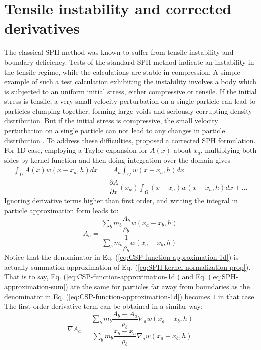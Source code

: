 \section{Tensile instability and corrected derivatives}
The classical SPH method was known to suffer from tensile instability and boundary deficiency. Tests of the standard SPH method indicate an instability in the tensile regime, while the calculations are stable in compression.  A simple example of such a test calculation exhibiting the instability involves a body which is subjected to an uniform initial stress, either compressive or tensile. If the initial stress is tensile, a very small velocity perturbation on a single particle can lead to particles clumping together, forming large voids and seriously corrupting density distribution. But if the initial stress is compressive, the small velocity perturbation on a single particle can not lead to any changes in particle distribution \citep{swegle1995smoothed}. To address these difficulties, \citep{chen1999improvement} proposed a corrected SPH formulation. For 1D case, employing a Taylor expansion for $A\left(x\right)$ about $x_a$, multiplying both sides by kernel function and then doing integration over the domain gives
\begin{equation}
\begin{split}
\int_{\Omega} A\left(x\right) w\left(x- x_a, h\right) dx 
& = A_a \int_{\Omega} w\left(x - x_a, h\right) dx \\
&+\dfrac{\partial A}{\partial x}(x_a) \int_{\Omega} \left(x-x_a\right) w\left(x - x_a, h\right) dx +...
\end{split}
\end{equation}
Ignoring derivative terms higher than first order, and writing the integral in particle approximation form leads to:
\begin{equation}
A_a = \frac{\sum_b m_b \dfrac{A_b}{\rho_b} w\left(x_a-x_b, h\right)}{\sum_b m_b \dfrac{1}{\rho_b} w\left(x_a-x_b, h\right)}
\label{eq:CSP-function-approximation-1d}
\end{equation}
Notice that the denominator in Eq. (\ref{eq:CSP-function-approximation-1d}) is actually summation approximation of Eq. (\ref{eq:SPH-kernel-normalization-prop}). That is to say, Eq. (\ref{eq:CSP-function-approximation-1d}) and Eq. (\ref{eq:SPH-approximation-sum}) are the same for particles far away from boundaries as the denominator in Eq. (\ref{eq:CSP-function-approximation-1d}) becomes $1$ in that case.
The first order derivative term can be obtained in a similar way:
\begin{equation}
\nabla A_a = \frac{\sum_b m_b \dfrac{A_b - A_a}{\rho_b} \nabla_a w\left(x_a-x_b, h\right)}{\sum_b m_b \dfrac{x_b - x_a}{\rho_b} \nabla_a w\left(x_a-x_b, h\right)}
\end{equation}

